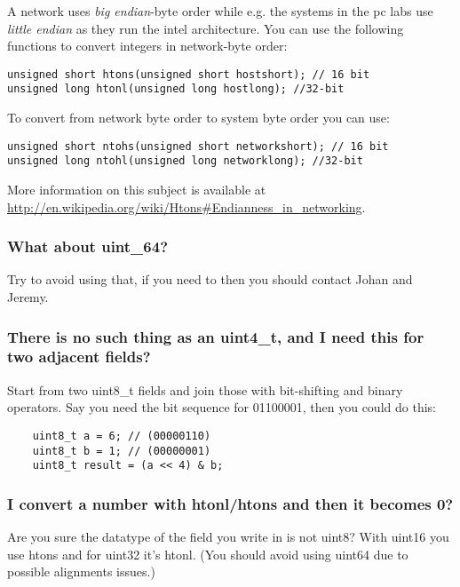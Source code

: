 \documentclass[a4paper]{article}
\begin{document}
A network uses \emph{big endian}-byte order while e.g. the systems in
the pc labs use \emph{little endian} as they run the intel architecture.
You can use the following functions to convert integers in network-byte
order:
\begin{lstlisting}
unsigned short htons(unsigned short hostshort); // 16 bit
unsigned long htonl(unsigned long hostlong); //32-bit
\end{lstlisting}

To convert from network byte order to system byte order you can use:
\begin{lstlisting}
unsigned short ntohs(unsigned short networkshort); // 16 bit
unsigned long ntohl(unsigned long networklong); //32-bit
\end{lstlisting}

More information on this subject is available at \url{http://en.wikipedia.org/wiki/Htons\#Endianness_in_networking}.

\subsubsection*{What about uint\_64?}

Try to avoid using that, if you need to then you should contact Johan and
Jeremy.

\subsubsection*{There is no such thing as an uint4\_t, and I need this for two adjacent
fields?}

Start from two uint8\_t fields and join those with bit-shifting and
binary operators. Say you need the bit sequence for 01100001, then you
could do this:

\begin{lstlisting}
	uint8_t a = 6; // (00000110)
	uint8_t b = 1; // (00000001)
	uint8_t result = (a << 4) & b;
\end{lstlisting}

\subsubsection*{I convert a number with htonl/htons and then it becomes 0?}

Are you sure the datatype of the field you write in is not uint8? With
uint16 you use htons and for uint32 it's htonl. (You should avoid using
uint64 due to possible alignments issues.)
\end{document}
